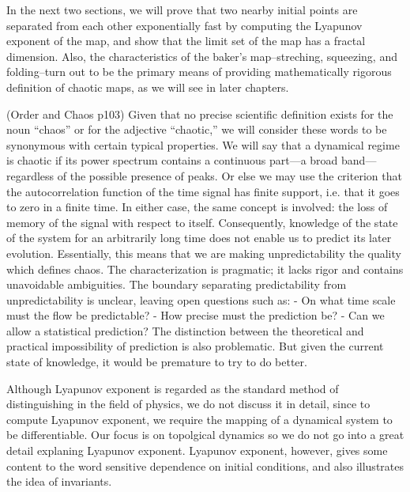 \documentclass[12pt,twoside]{book}
\begin{document}
In the next two sections, we will prove that two nearby initial points are separated from each other exponentially fast by computing the Lyapunov exponent of the map, and show that the limit set of the map has a fractal dimension.
Also, the characteristics of the baker's map--streching, squeezing, and folding--turn out to be the primary means of providing mathematically rigorous definition of chaotic maps, as we will see in later chapters.

(Order and Chaos p103)
Given that no precise scientific definition exists for the noun ``chaos'' or for the adjective ``chaotic,'' we will consider these words to be synonymous with certain typical properties.
We will say that a dynamical regime is chaotic if its power spectrum contains a continuous part---a broad band---regardless of the possible presence of peaks.
Or else we may use the criterion that the autocorrelation function of the time signal has finite support, i.e. that it goes to zero in a finite time.
In either case, the same concept is involved: the loss of memory of the signal with respect to itself.
Consequently, knowledge of the state of the system for an arbitrarily long time does not enable us to predict its later evolution.
Essentially, this means that we are making unpredictability the quality which defines chaos.
The characterization is pragmatic; it lacks rigor and contains unavoidable ambiguities.
The boundary separating predictability from unpredictability is unclear, leaving open questions such as:
- On what time scale must the flow be predictable?
- How precise must the prediction be?
- Can we allow a statistical prediction?
The distinction between the theoretical and practical impossibility of prediction is also problematic.
But given the current state of knowledge, it would be premature to try to do better.

Although Lyapunov exponent is regarded as the standard method of distinguishing in the field of physics, we do not discuss it in detail, since to compute Lyapunov exponent, we require the mapping of a dynamical system to be differentiable.
Our focus is on topolgical dynamics so we do not go into a great detail explaning Lyapunov exponent.
Lyapunov exponent, however, gives some content to the word sensitive dependence on initial conditions, and also illustrates the idea of invariants.
\end{document}
